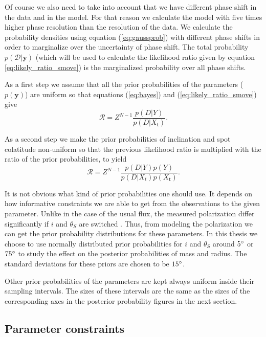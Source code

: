 \documentclass{wihuri}
\def\be{\begin{equation}}
\def\ee{\end{equation}}
\def\thetas{\theta_{S}}
\def\tstep{\mathsf{t}}
\def\lratio{\mathcal{R}}
\begin{document}
Of course we also need to take into account that we have different phase shift in the data and in the model. For that reason we calculate the model with five times higher phase resolution than the resolution of the data. We calculate the probability densities using equation (\ref{eq:gaussprob}) with different phase shifts in order to marginalize over the uncertainty of phase shift. %
The total probability $p(\mathcal{D}|\textbf{y})$ (which will be used to calculate the likelihood ratio given by equation \ref{eq:likely_ratio_smove}) is the marginalized probability over all phase shifts. 

As a first step we assume that all the prior probabilities of the parameters ($p(\textbf{y})$) are uniform so that equations (\ref{eq:bayes}) and (\ref{eq:likely_ratio_smove}) give 
\be \label{eq:alpha1}
\lratio = Z^{N-1}\frac{p(D|Y)}{p(D|X_{\tstep})}.
\ee

As a second step we make the prior probabilities of inclination and spot colatitude non-uniform so that the previous likelihood ratio is multiplied with the ratio of the prior probabilities, to yield
\be \label{eq:alpha2}
\lratio = Z^{N-1}\frac{p(D|Y)p(Y)}{p(D|X_{t})p(X_{\tstep})}.
\ee

It is not obvious what kind of prior probabilities one should use. It depends on how informative constraints we are able to get from the observations to the given parameter. Unlike in the case of the usual flux, the measured polarization differ significantly if $i$ and $\thetas$ are switched \cite{poutaviironen}. Thus, from modeling the polarization we can get the prior probability distributions for these parameters. In this thesis we choose to use normally distributed prior probabilities for $i$ and $\thetas$ around $5 \degree$ or $75 \degree$ to study the effect on the posterior probabilities of mass and radius. The standard deviations for these priors are chosen to be $15 \degree$. 

Other prior probabilities of the parameters are kept always uniform inside their sampling intervals. The sizes of these intervals are the same as the sizes of the corresponding axes in the posterior probability figures in the next section. 



\subsection{Parameter constraints}
\end{document}

